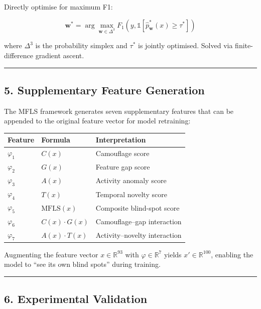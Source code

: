 \documentclass[
  11pt,
]{article}
\newcounter{none} %
\begin{document}
Directly optimise for maximum F1:

\[\mathbf{w}^* = \arg\max_{\mathbf{w} \in \Delta^3} F_1\!\left(y, \mathbb{1}\!\left[\hat{p}^*_{\mathbf{w}}(x) \geq \tau^*\right]\right)\]

where \(\Delta^3\) is the probability simplex and \(\tau^*\) is jointly
optimised. Solved via finite-difference gradient ascent.

\begin{center}\rule{0.5\linewidth}{0.5pt}\end{center}

\subsection{5. Supplementary Feature
Generation}\label{supplementary-feature-generation}

The MFLS framework generates seven supplementary features that can be
appended to the original feature vector for model retraining:

{\def\LTcaptype{none} %
\begin{longtable}[]{@{}lll@{}}
\toprule\noalign{}
Feature & Formula & Interpretation \\
\midrule\noalign{}
\endhead
\bottomrule\noalign{}
\endlastfoot
\(\varphi_1\) & \(C(x)\) & Camouflage score \\
\(\varphi_2\) & \(G(x)\) & Feature gap score \\
\(\varphi_3\) & \(A(x)\) & Activity anomaly score \\
\(\varphi_4\) & \(T(x)\) & Temporal novelty score \\
\(\varphi_5\) & \(\text{MFLS}(x)\) & Composite blind-spot score \\
\(\varphi_6\) & \(C(x) \cdot G(x)\) & Camouflage–gap interaction \\
\(\varphi_7\) & \(A(x) \cdot T(x)\) & Activity–novelty interaction \\
\end{longtable}
}

Augmenting the feature vector \(x \in \mathbb{R}^{93}\) with
\(\varphi \in \mathbb{R}^7\) yields \(x' \in \mathbb{R}^{100}\),
enabling the model to “see its own blind spots” during training.

\begin{center}\rule{0.5\linewidth}{0.5pt}\end{center}

\subsection{6. Experimental Validation}\label{experimental-validation}
\end{document}
